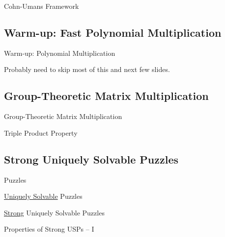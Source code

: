 \documentclass[t,10pt,
mathserif,xcolor=dvipsnames]{beamer}
\begin{document}
\begin{myframe}{Cohn-Umans Framework}

\end{myframe}

\subsection{Warm-up: Fast Polynomial Multiplication}

\begin{myframe}{Warm-up: Polynomial Multiplication}

  Probably need to skip most of this and next few slides.
  
\end{myframe}

\subsection{Group-Theoretic Matrix Multiplication}

\begin{myframe}{Group-Theoretic Matrix Multiplication}

\end{myframe}

\begin{myframe}{Triple Product Property}

\end{myframe}

\subsection{Strong Uniquely Solvable Puzzles}

\begin{myframe}{Puzzles}

\end{myframe}

\begin{myframe}{\uline{Uniquely Solvable} Puzzles}

\end{myframe}

\begin{myframe}{\uline{Strong} Uniquely Solvable Puzzles}

\end{myframe}

\begin{myframe}{Properties of Strong USPs -- I}

\end{myframe}
\end{document}
